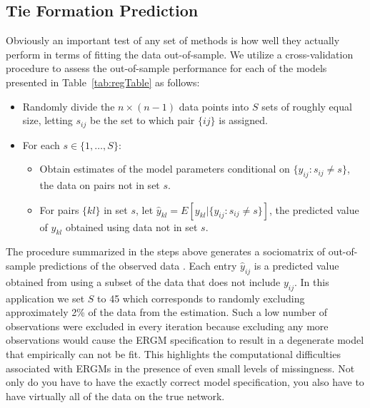 \documentclass[12pt,pdflatex]{elsarticle}
\begin{document}
\subsection{Tie Formation Prediction}

Obviously an important test of any set of methods is how well they actually perform in terms of fitting the data out-of-sample. We utilize a cross-validation procedure to assess the out-of-sample performance for each of the models presented in Table~\ref{tab:regTable} as follows:

\begin{itemize}
	\item Randomly divide the $n \times (n-1)$ data points into $S$ sets of roughly equal size, letting $s_{ij}$ be the set to which pair $\{ij\}$ is assigned.
	\item For each $s \in \{1, \ldots, S\}$:
	\begin{itemize}
		\item Obtain estimates of the model parameters conditional on $\{y_{ij} : s_{ij} \neq s\}$, the data on pairs not in set $s$.
		\item For pairs $\{kl\}$ in set $s$, let $\hat y_{kl} = E[y_{kl} | \{y_{ij} : s_{ij} \neq s\}]$, the predicted value of $y_{kl}$ obtained using data not in set $s$.
	\end{itemize}
\end{itemize}

The procedure summarized in the steps above generates a sociomatrix of out-of-sample predictions of the observed data \citep{hoff:2008}. Each entry $\hat y_{ij}$ is a predicted value obtained from using a subset of the data that does not include $y_{ij}$. In this application we set $S$ to 45 which corresponds to randomly excluding approximately 2\% of the data from the estimation. Such a low number of observations were excluded in every iteration because excluding any more observations would cause the ERGM specification to result in a degenerate model that empirically can not be fit. This highlights the computational difficulties associated with ERGMs in the presence of even small levels of missingness.  Not only do you have to have the exactly
correct model specification, you also have to have virtually all of the data on the true network.
\end{document}
